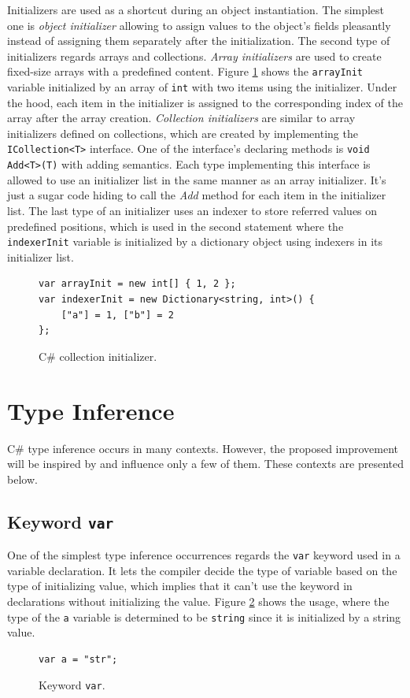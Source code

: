 Initializers are used as a shortcut during an object instantiation.
The simplest one is \textit{object initializer} allowing to assign values to the object's fields pleasantly instead of assigning them separately after the initialization.
The second type of initializers regards arrays and collections.
\textit{Array initializers} are used to create fixed-size arrays with a predefined content.
Figure \ref{img07:initializer} shows the \texttt{arrayInit} variable initialized by an array of \texttt{int} with two items using the initializer.
Under the hood, each item in the initializer is assigned to the corresponding index of the array after the array creation.
\textit{Collection initializers} are similar to array initializers defined on collections, which are created by implementing the \texttt{ICollection<T>} interface.
One of the interface's declaring methods is \texttt{void Add<T>(T)} with adding semantics.
Each type implementing this interface is allowed to use an initializer list in the same manner as an array initializer.
It's just a sugar code hiding to call the \textit{Add} method for each item in the initializer list.
The last type of an initializer uses an indexer to store referred values on predefined positions, which is used in the second statement where the \texttt{indexerInit} variable is initialized by a dictionary object using indexers in its initializer list.
\begin{figure}[h]
\begin{lstlisting}[style=csharp]
var arrayInit = new int[] { 1, 2 };
var indexerInit = new Dictionary<string, int>() { 
    ["a"] = 1, ["b"] = 2 
};
\end{lstlisting}
\caption{C\# collection initializer.}
\label{img07:initializer}
\end{figure}

\section{Type Inference} \label{sect02:typeInference}

C\# type inference occurs in many contexts. 
However, the proposed improvement will be inspired by and influence only a few of them.
These contexts are presented below.

\subsection{Keyword \texttt{var}}
One of the simplest type inference occurrences regards the \texttt{var} keyword used in a variable declaration.
It lets the compiler decide the type of variable based on the type of initializing value, which implies that it can’t use the keyword in declarations without initializing the value.
Figure \ref{img07:var} shows the usage, where the type of the \texttt{a} variable is determined to be \texttt{string} since it is initialized by a string value. 
\begin{figure}[h]
\begin{lstlisting}[style=csharp]
var a = "str";
\end{lstlisting}
\caption{Keyword \texttt{var}.}
\label{img07:var}
\end{figure}

